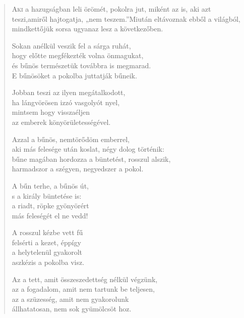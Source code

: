 
\vspace*{-\baselineskip}
\begin{verse}

{\par%
\lettrine[slope=0.5em]{A}{ki} {\LettrineTextFont a hazugságban leli örömét, pokolra jut,}\newline
miként az is, aki azt teszi,\newline amiről hajtogatja,
„nem teszem.”\verselinebreak Miután eltávoznak ebből a világból,\verselinebreak
mindkettőjük sorsa ugyanaz lesz a következőben.
\par}

 Sokan anélkül veszik fel a sárga ruhát,\\
hogy előtte megfékezték volna önmagukat,\\
és bűnös természetük továbbra is megmarad.\\
E bűnösöket a pokolba juttatják bűneik.

 Jobban teszi az ilyen megátalkodott,\\
ha lángvörösen izzó vasgolyót nyel,\\
mintsem hogy visszaéljen\\
az emberek könyörületességével.

 Azzal a bűnös, nemtörődöm emberrel,\\
aki más felesége után koslat, négy dolog történik:\\
bűne magában hordozza a büntetést, rosszul alszik,\\
harmadszor a szégyen, negyedszer a pokol.

 A bűn terhe, a bűnös út,\\
s a király büntetése is:\\
a riadt, röpke gyönyörért\\
más feleségét el ne vedd!

 A rosszul kézbe vett fű\\
felsérti a kezet, éppígy\\
a helytelenül gyakorolt\\
aszkézis a pokolba visz.

 Az a tett, amit összeszedettség nélkül végzünk,\\
az a fogadalom, amit nem tartunk be teljesen,\\
az a szüzesség, amit nem gyakorolunk\\
állhatatosan, nem sok gyümölcsöt hoz.


\end{verse}
